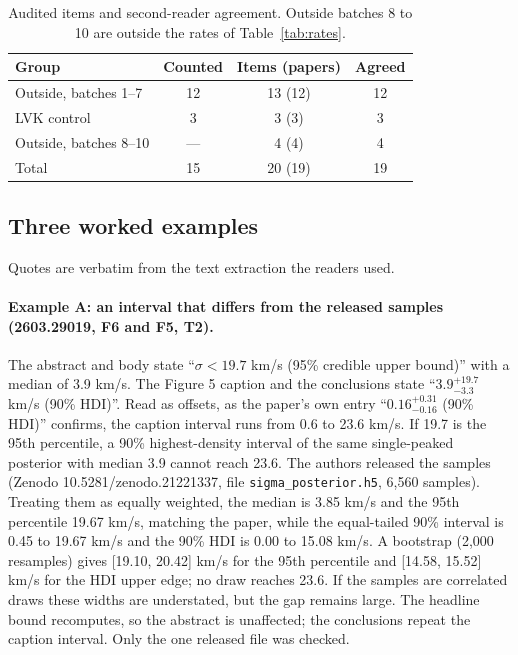 \documentclass[reprint,amsmath,amssymb,aps,superscriptaddress,nofootinbib]{revtex4-2}
\begin{document}
\begin{table}[t]
\caption{Audited items and second-reader agreement. Outside batches 8 to 10 are outside the rates of Table~\ref{tab:rates}.}
\label{tab:agree}
\centering\small
\begin{tabular}{lccc}
\hline\hline
Group & Counted & Items (papers) & Agreed \\ \hline
Outside, batches 1--7 & 12 & 13 (12) & 12 \\
LVK control & 3 & 3 (3) & 3 \\
Outside, batches 8--10 & --- & 4 (4) & 4 \\
Total & 15 & 20 (19) & 19 \\
\hline\hline
\end{tabular}
\end{table}

\subsection{Three worked examples}
\label{sec:examples}

Quotes are verbatim from the text extraction the readers used.

\paragraph*{Example A: an interval that differs from the released samples (2603.29019, F6 and F5, T2).} The abstract and body state ``$\sigma < 19.7$ km/s (95\% credible upper bound)'' with a median of 3.9 km/s. The Figure 5 caption and the conclusions state ``$3.9^{+19.7}_{-3.3}$ km/s (90\% HDI)''. Read as offsets, as the paper's own entry ``$0.16^{+0.31}_{-0.16}$ (90\% HDI)'' confirms, the caption interval runs from 0.6 to 23.6 km/s. If 19.7 is the 95th percentile, a 90\% highest-density interval of the same single-peaked posterior with median 3.9 cannot reach 23.6. The authors released the samples (Zenodo 10.5281/zenodo.21221337, file \texttt{sigma\_posterior.h5}, 6,560 samples). Treating them as equally weighted, the median is 3.85 km/s and the 95th percentile 19.67 km/s, matching the paper, while the equal-tailed 90\% interval is 0.45 to 19.67 km/s and the 90\% HDI is 0.00 to 15.08 km/s. A bootstrap (2,000 resamples) gives [19.10, 20.42] km/s for the 95th percentile and [14.58, 15.52] km/s for the HDI upper edge; no draw reaches 23.6. If the samples are correlated draws these widths are understated, but the gap remains large. The headline bound recomputes, so the abstract is unaffected; the conclusions repeat the caption interval. Only the one released file was checked.
\end{document}
